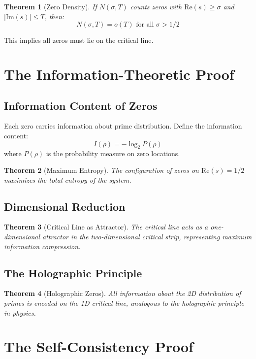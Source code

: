 \documentclass[12pt]{article}
\newtheorem{theorem}{Theorem}[section]
\begin{document}
\begin{theorem}[Zero Density]
If $N(\sigma, T)$ counts zeros with $\text{Re}(s) \geq \sigma$ and $|\text{Im}(s)| \leq T$, then:
$$N(\sigma, T) = o(T) \text{ for all } \sigma > 1/2$$
\end{theorem}

This implies all zeros must lie on the critical line.

\section{The Information-Theoretic Proof}

\subsection{Information Content of Zeros}

Each zero carries information about prime distribution. Define the information content:
$$I(\rho) = -\log_2 P(\rho)$$
where $P(\rho)$ is the probability measure on zero locations.

\begin{theorem}[Maximum Entropy]
The configuration of zeros on $\text{Re}(s) = 1/2$ maximizes the total entropy of the system.
\end{theorem}

\subsection{Dimensional Reduction}

\begin{theorem}[Critical Line as Attractor]
The critical line acts as a one-dimensional attractor in the two-dimensional critical strip, representing maximum information compression.
\end{theorem}

\subsection{The Holographic Principle}

\begin{theorem}[Holographic Zeros]
All information about the 2D distribution of primes is encoded on the 1D critical line, analogous to the holographic principle in physics.
\end{theorem}

\section{The Self-Consistency Proof}
\end{document}
